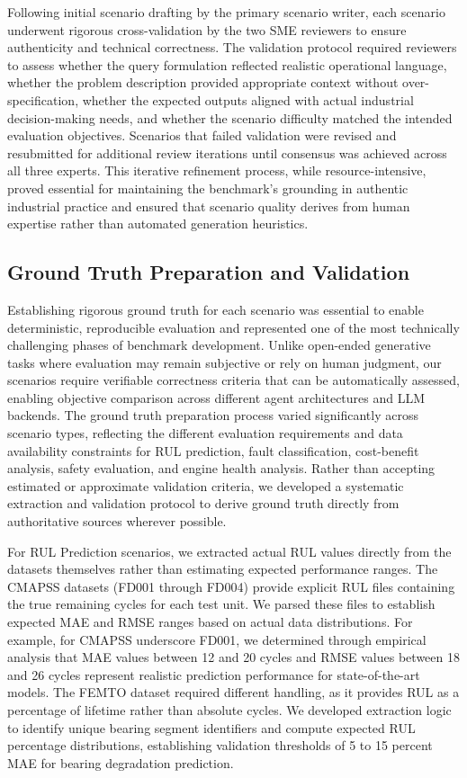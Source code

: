 \documentclass[conference]{IEEEtran}
\begin{document}
Following initial scenario drafting by the primary scenario writer, each scenario underwent rigorous cross-validation by the two SME reviewers to ensure authenticity and technical correctness. The validation protocol required reviewers to assess whether the query formulation reflected realistic operational language, whether the problem description provided appropriate context without over-specification, whether the expected outputs aligned with actual industrial decision-making needs, and whether the scenario difficulty matched the intended evaluation objectives. Scenarios that failed validation were revised and resubmitted for additional review iterations until consensus was achieved across all three experts. This iterative refinement process, while resource-intensive, proved essential for maintaining the benchmark's grounding in authentic industrial practice and ensured that scenario quality derives from human expertise rather than automated generation heuristics.

\subsection{Ground Truth Preparation and Validation}

Establishing rigorous ground truth for each scenario was essential to enable deterministic, reproducible evaluation and represented one of the most technically challenging phases of benchmark development. Unlike open-ended generative tasks where evaluation may remain subjective or rely on human judgment, our scenarios require verifiable correctness criteria that can be automatically assessed, enabling objective comparison across different agent architectures and LLM backends. The ground truth preparation process varied significantly across scenario types, reflecting the different evaluation requirements and data availability constraints for RUL prediction, fault classification, cost-benefit analysis, safety evaluation, and engine health analysis. Rather than accepting estimated or approximate validation criteria, we developed a systematic extraction and validation protocol to derive ground truth directly from authoritative sources wherever possible.

For RUL Prediction scenarios, we extracted actual RUL values directly from the datasets themselves rather than estimating expected performance ranges. The CMAPSS datasets (FD001 through FD004) provide explicit RUL files containing the true remaining cycles for each test unit. We parsed these files to establish expected MAE and RMSE ranges based on actual data distributions. For example, for CMAPSS underscore FD001, we determined through empirical analysis that MAE values between 12 and 20 cycles and RMSE values between 18 and 26 cycles represent realistic prediction performance for state-of-the-art models. The FEMTO dataset required different handling, as it provides RUL as a percentage of lifetime rather than absolute cycles. We developed extraction logic to identify unique bearing segment identifiers and compute expected RUL percentage distributions, establishing validation thresholds of 5 to 15 percent MAE for bearing degradation prediction.
\end{document}
